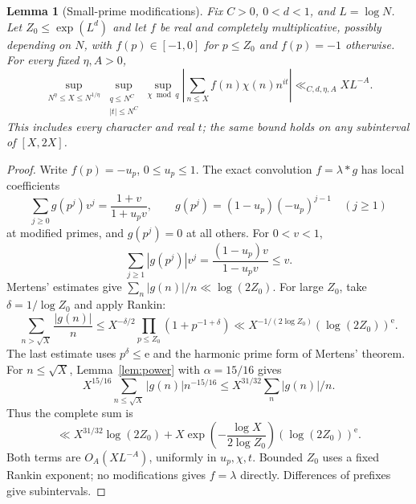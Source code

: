 \documentclass[11pt]{article}
\newtheorem{lemma}[theorem]{Lemma}
\theoremstyle{definition}
\theoremstyle{remark}
\begin{document}
\begin{lemma}[Small-prime modifications]\label{lem:modifications}
Fix $C>0$, $0<d<1$, and $L=\log N$.
Let $Z_0\le\exp(L^d)$ and let $f$ be real and completely
multiplicative, possibly depending on $N$, with
$f(p)\in[-1,0]$ for $p\le Z_0$ and $f(p)=-1$ otherwise.
For every fixed $\eta,A>0$,
\begin{equation}\label{eq:modified-mean}
\sup_{N^\eta\le X\le N^{1/\eta}}
\sup_{\substack{q\le N^C\\|t|\le N^C}}
\sup_{\chi\bmod q}
\left|\sum_{n\le X}f(n)\chi(n)n^{it}\right|
\ll_{C,d,\eta,A}XL^{-A}.
\end{equation}
This includes every character and real $t$; the same bound holds on
any subinterval of $[X,2X]$.
\end{lemma}
\begin{proof}
Write $f(p)=-u_p$, $0\le u_p\le1$. The exact convolution $f=\lambda*g$
has local coefficients
\begin{equation}\label{eq:modified-euler}
\sum_{j\ge0}g(p^j)v^j=\frac{1+v}{1+u_pv},\qquad
g(p^j)=(1-u_p)(-u_p)^{j-1}\quad(j\ge1)
\end{equation}
at modified primes, and $g(p^j)=0$ at all others. For $0<v<1$,
\begin{equation}\label{eq:modified-local-bound}
\sum_{j\ge1}|g(p^j)|v^j
=\frac{(1-u_p)v}{1-u_pv}\le v.
\end{equation}
Mertens' estimates give
$\sum_n|g(n)|/n\ll\log(2Z_0)$.
For large $Z_0$, take $\delta=1/\log Z_0$ and apply Rankin:
\begin{equation}\label{eq:modified-tail}
\sum_{n>\sqrt X}\frac{|g(n)|}{n}
\le X^{-\delta/2}\prod_{p\le Z_0}(1+p^{-1+\delta})
\ll X^{-1/(2\log Z_0)}(\log(2Z_0))^{\mathrm e}.
\end{equation}
The last estimate uses $p^\delta\le\mathrm e$ and the harmonic
prime form of Mertens' theorem.
For $n\le\sqrt X$, Lemma~\ref{lem:power} with $\alpha=15/16$ gives
\[
X^{15/16}\sum_{n\le\sqrt X}|g(n)|n^{-15/16}
\le X^{31/32}\sum_n|g(n)|/n.
\]
Thus the complete sum is
\begin{equation}\label{eq:modified-total}
\ll X^{31/32}\log(2Z_0)
+X\exp\left(-\frac{\log X}{2\log Z_0}\right)
                        (\log(2Z_0))^{\mathrm e}.
\end{equation}
Both terms are $O_A(XL^{-A})$, uniformly in $u_p,\chi,t$.
Bounded $Z_0$ uses a fixed Rankin exponent; no modifications gives
$f=\lambda$ directly. Differences of prefixes give subintervals.
\end{proof}
\end{document}
